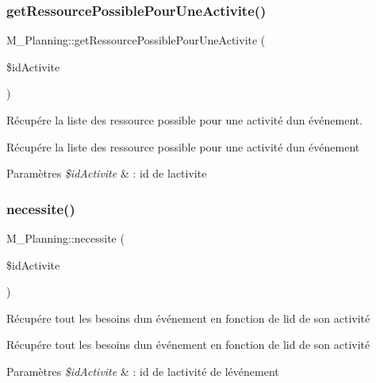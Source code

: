 \subsubsection{\texorpdfstring{get\+Ressource\+Possible\+Pour\+Une\+Activite()}{getRessourcePossiblePourUneActivite()}}
{\footnotesize\ttfamily M\+\_\+\+Planning\+::get\+Ressource\+Possible\+Pour\+Une\+Activite (\begin{DoxyParamCaption}\item[{}]{\$id\+Activite }\end{DoxyParamCaption})}



Récupére la liste des ressource possible pour une activité d\textquotesingle{}un événement. 

Récupére la liste des ressource possible pour une activité d\textquotesingle{}un événement 
\begin{DoxyParams}{Paramètres}
{\em \$id\+Activite} & \+: id de l\textquotesingle{}activite \\
\hline
\end{DoxyParams}
\mbox{\label{class_m___planning_aad09d20b96fb6a40dfa2c347d0cc6d6c}} 
\subsubsection{\texorpdfstring{necessite()}{necessite()}}
{\footnotesize\ttfamily M\+\_\+\+Planning\+::necessite (\begin{DoxyParamCaption}\item[{}]{\$id\+Activite }\end{DoxyParamCaption})}



Récupére tout les besoins d\textquotesingle{}un événement en fonction de l\textquotesingle{}id de son activité 

Récupére tout les besoins d\textquotesingle{}un événement en fonction de l\textquotesingle{}id de son activité 
\begin{DoxyParams}{Paramètres}
{\em \$id\+Activite} & \+: id de l\textquotesingle{}activité de l\textquotesingle{}événement \\
\hline
\end{DoxyParams}
\mbox{\label{class_m___planning_a86a09269af409629a60bf86a2bd19421}} 
